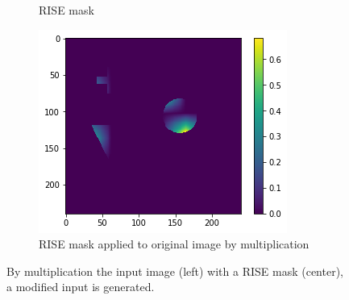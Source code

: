 \begin{figure}[H]
\begin{subfigure}[t]{.32\textwidth}
        \caption{RISE mask}
    \end{subfigure}\hfill%
    \begin{subfigure}[t]{.32\textwidth}
        \centering
        \includegraphics[width=\linewidth]{chapters/02_methods/images/rise/rise0_applied.png}
        \caption{RISE mask applied to original image by multiplication}
    \end{subfigure}
    \caption{By multiplication the input image (left) with a RISE mask (center), a modified input is generated.}
    \label{rise_mask0}
\end{figure}


